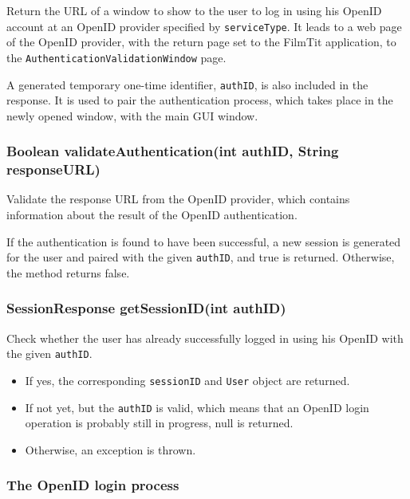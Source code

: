 {Return the URL of a window to show to the user to log in using his OpenID account at an OpenID provider specified by {\tt serviceType}. It leads to a web page of the OpenID provider, with the return page set to the FilmTit application, to the {\tt AuthenticationValidationWindow} page.

A generated temporary one-time identifier, {\tt authID}, is also included in the response. It is used to pair the authentication process, which takes place in the newly opened window, with the main GUI window.

\subsubsection{Boolean validateAuthentication(int authID, String responseURL)}

Validate the response URL from the OpenID provider, which contains information about the result of the OpenID authentication.

If the authentication is found to have been successful, a new session is generated for the user and paired with the given {\tt authID}, and true is returned.
Otherwise, the method returns false.

\subsubsection{SessionResponse getSessionID(int authID)}

Check whether the user has already successfully logged in using his OpenID with the given {\tt authID}.

\begin{itemize}
\item If yes, the corresponding {\tt sessionID} and {\tt User} object are returned.
\item If not yet, but the {\tt authID} is valid, which means that an OpenID login operation is probably still in progress, null is returned.
\item Otherwise, an exception is thrown.
\end{itemize}

\subsubsection{The OpenID login process}
\label{subsubsec:gui:openid}

}
